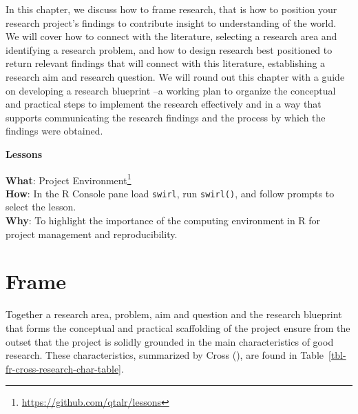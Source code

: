 \documentclass[
  letterpaper,
  DIV=11,
  numbers=noendperiod]{scrreprt}
\theoremstyle{definition}
\theoremstyle{remark}
\DeclareRobustCommand{\href}[2]{#2\footnote{\url{#1}}}
\begin{document}
In this chapter, we discuss how to frame research, that is how to
position your research project's findings to contribute insight to
understanding of the world. We will cover how to connect with the
literature, selecting a research area and identifying a research
problem, and how to design research best positioned to return relevant
findings that will connect with this literature, establishing a research
aim and research question. We will round out this chapter with a guide
on developing a research blueprint --a working plan to organize the
conceptual and practical steps to implement the research effectively and
in a way that supports communicating the research findings and the
process by which the findings were obtained.

\begin{tcolorbox}[enhanced jigsaw, leftrule=.75mm, colframe=quarto-callout-color-frame, colback=white, rightrule=.15mm, opacityback=0, arc=.35mm, breakable, bottomrule=.15mm, left=2mm, toprule=.15mm]

\textbf{ Lessons}

\textbf{What}: \href{https://github.com/qtalr/lessons}{Project
Environment}\\
\textbf{How}: In the R Console pane load \texttt{swirl}, run
\texttt{swirl()}, and follow prompts to select the lesson.\\
\textbf{Why}: To highlight the importance of the computing environment
in R for project management and reproducibility.

\end{tcolorbox}

\section{Frame}\label{sec-fr-frame}

Together a research area, problem, aim and question and the research
blueprint that forms the conceptual and practical scaffolding of the
project ensure from the outset that the project is solidly grounded in
the main characteristics of good research. These characteristics,
summarized by Cross (), are found in
Table~\ref{tbl-fr-cross-research-char-table}.
\end{document}
